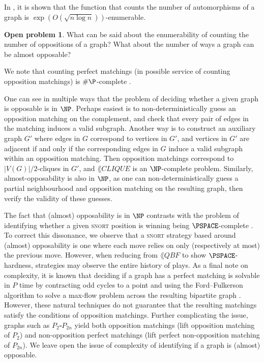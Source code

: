 \documentclass[11pt]{article}
\theoremstyle{definition}
\newtheorem{problem}[theorem]{Open problem}
\begin{document}
In \cite{beals.chang.ea:automorphisms}, it is shown that the function that
counts the number of automorphisms of a graph is $\exp(O(\sqrt{n\log
n}))$-enumerable. 
\begin{problem}
    What can be said about the enumerability of counting the number of
    oppositions of a graph? What about the number of ways a graph can be almost
    opposable?
\end{problem}
We note that counting perfect matchings (in possible service of counting
opposition matchings) is $\#\P$-complete \cite{valiant:complexity}.

One can see in multiple ways that the problem of deciding whether a given graph
is opposable is in $\NP$. Perhaps easiest is to non-deterministically guess an
opposition matching on the complement, and check that every pair of edges in
the matching induces a valid subgraph. Another way is to construct an auxiliary
graph $G'$ where edges in $G$ correspond to vertices in $G'$, and vertices in
$G'$ are adjacent if and only if the corresponding edges in $G$ induce a valid
subgraph within an opposition matching. Then opposition matchings correspond to
$|V(G)|/2$-cliques in $G'$, and $\lang{CLIQUE}$ is an $\NP$-complete problem.
Similarly, almost-opposability is also in $\NP$, as one can
non-deterministically guess a partial neighbourhood and opposition matching on
the resulting graph, then verify the validity of these guesses. 

The fact that (almost) opposability is in $\NP$ contrasts with the problem of
identifying whether a given \textsc{snort} position is winning being
$\PSPACE$-complete \cite{schaefer:complexity}. To correct this dissonance, we
observe that a \textsc{snort} strategy based around (almost) opposability is
one where each move relies on only (respectively at most) the previous move.
However, when reducing from $\lang{QBF}$ to show $\PSPACE$-hardness, strategies
may observe the entire history of plays. As a final note on complexity, it is
known that deciding if a graph has a perfect matching is solvable in $P$ time
by contracting odd cycles to a point and using the Ford--Fulkerson algorithm to
solve a max-flow problem across the resulting bipartite graph
\cite{edmonds:paths}. However, these natural techniques do not guarantee that
the resulting matchings satisfy the conditions of opposition matchings. Further
complicating the issue, graphs such as $P_2\square P_{2n}$ yield both
opposition matchings (lift opposition matching of $P_2$) and non-opposition
perfect matchings (lift perfect non-opposition matching of $P_{2n}$). We leave
open the issue of complexity of identifying if a graph is (almost) opposable.
\end{document}

